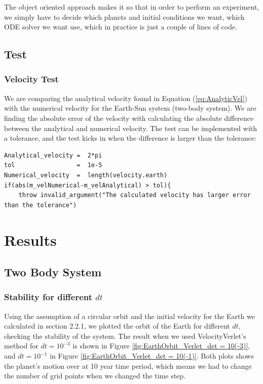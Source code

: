 \documentclass[norsk,a4paper,12pt]{article}
\begin{document}
{The object oriented approach makes it so that in order to perform an experiment, we simply have to decide which planets and initial conditions we want, which ODE solver we want use, which in practice is just a couple of lines of code.

\subsection{Test}
\subsubsection{Velocity Test}
We are comparing the analytical velocity found in Equation ({\ref{eq:AnalyticVel}}) with the numerical velocity for the Earth-Sun system (two-body system). We are finding the absolute error of the velocity with calculating the absolute difference between the analytical and numerical velocity. The test can be implemented with a tolerance, and the test kicks in when the difference is larger than the tolerance:
\begin{lstlisting}
Analytical_velocity =  2*pi
tol                 =  1e-5
Numerical_velocity  =  length(velocity.earth)
if(abs(m_velNumerical-m_velAnalytical) > tol){
    throw invalid_argument("The calculated velocity has larger error than the tolerance")
\end{lstlisting}

\section{Results}
\subsection{Two Body System}
\subsubsection{Stability for different $dt$}

Using the assumption of a circular orbit and the initial velocity for the Earth we calculated in section 2.2.1, we plotted the orbit of the Earth for different $dt$, checking the stability of the system. The result when we used VelocityVerlet's method for $dt = 10^{-3}$ is shown in Figure \ref{fig:EarthOrbit_Verlet_det = 10(-3)}, and $dt = 10^{-1}$ in Figure \ref{fig:EarthOrbit_Verlet_det = 10(-1)}. Both plots shows the planet's motion over at 10 year time period, which means we had to change the number of grid points when we changed the time step.
\par 
\vspace{3mm}

}
\end{document}

